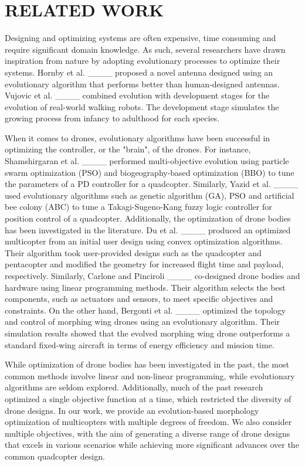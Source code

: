 \section{RELATED WORK}
Designing and optimizing systems are often expensive, time consuming and require significant domain knowledge. As such, several researchers have drawn inspiration from nature by adopting evolutionary processes to optimize their systems. Hornby et al. ____ proposed a novel antenna designed using an evolutionary algorithm that performs better than human-designed antennas.
Vujovic et al. ____ combined evolution with development stages for the evolution of real-world walking robots. The development stage simulates the growing process from infancy to adulthood for each species.

When it comes to drones, evolutionary algorithms have been successful in optimizing the controller, or the "brain", of the drones. For instance, Shamshirgaran et al. ____ performed multi-objective evolution using particle swarm optimization (PSO) and biogeography-based
optimization (BBO) to tune the parameters of a PD controller for a quadcopter. Similarly, Yazid et al. ____ used evolutionary algorithms such as genetic algorithm (GA), PSO and artificial bee colony (ABC) to tune a Takagi-Sugeno-Kang fuzzy logic controller for position control of a quadcopter. Additionally, the optimization of drone bodies has been investigated in the literature.  Du et al. ____ produced an optimized multicopter from an initial user design using convex optimization algorithms. Their algorithm took user-provided designs such as the quadcopter and pentacopter and modified the geometry for increased flight time and payload, respectively. Similarly, Carlone and Pinciroli ____ co-designed drone bodies and hardware using linear programming methods. Their algorithm selects the best components, such as actuators and sensors, to meet specific objectives and constraints. On the other hand, Bergonti et al. ____ optimized the topology and control of morphing wing drones using an evolutionary algorithm. Their simulation results showed that the evolved morphing wing drone outperforms a standard fixed-wing aircraft in terms of energy efficiency and mission time. 

While optimization of drone bodies has been investigated in the past, the most common methods involve linear and non-linear programming, while evolutionary algorithms are seldom explored. Additionally, much of the past research optimized a single objective function at a time, which restricted the diversity of drone designs. In our work, we provide an evolution-based morphology optimization of multicopters with multiple degrees of freedom. We also consider multiple objectives, with the aim of generating a diverse range of drone designs that excels in various scenarios while achieving more significant advances over the common quadcopter design.
